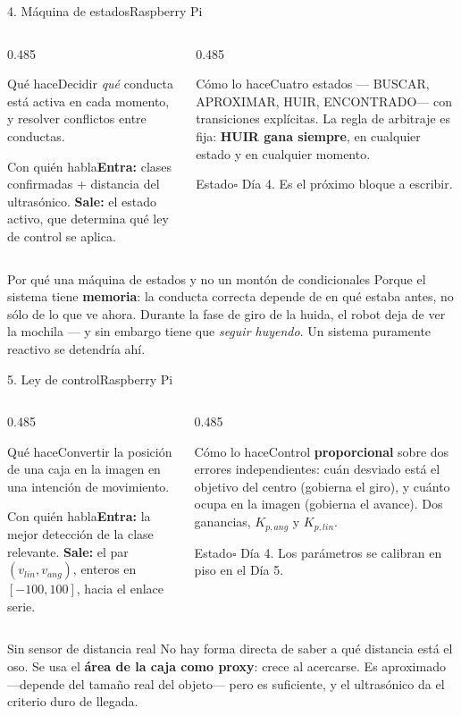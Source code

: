 \documentclass[aspectratio=169,10pt]{beamer}
\newcommand{\pend}{\textcolor{grisclaro}{$\square$}}
\newcommand{\ficha}[4]{%
  {\footnotesize
  \begin{columns}[T,onlytextwidth]
    \begin{column}{0.485\textwidth}
      \begin{block}{Qué hace}#1\end{block}
      \begin{block}{Con quién habla}#3\end{block}
    \end{column}
    \begin{column}{0.485\textwidth}
      \begin{block}{Cómo lo hace}#2\end{block}
      \begin{block}{Estado}#4\end{block}
    \end{column}
  \end{columns}}}
\begin{document}
\begin{frame}{4. Máquina de estados\hfill{\small\mdseries Raspberry Pi}}
  \ficha
  {Decidir \emph{qué} conducta está activa en cada momento, y resolver
   conflictos entre conductas.}
  {Cuatro estados --- BUSCAR, APROXIMAR, HUIR, ENCONTRADO--- con transiciones
   explícitas. La regla de arbitraje es fija: \textbf{HUIR gana siempre}, en
   cualquier estado y en cualquier momento.}
  {\textbf{Entra:} clases confirmadas + distancia del ultrasónico.
   \textbf{Sale:} el estado activo, que determina qué ley de control se aplica.}
  {\pend{} Día 4. Es el próximo bloque a escribir.}

  \vspace{0.4em}
  \small
  \begin{block}{Por qué una máquina de estados y no un montón de condicionales}
    Porque el sistema tiene \textbf{memoria}: la conducta correcta depende de en
    qué estaba antes, no sólo de lo que ve ahora. Durante la fase de giro de la
    huida, el robot deja de ver la mochila --- y sin embargo tiene que
    \emph{seguir huyendo}. Un sistema puramente reactivo se detendría ahí.
  \end{block}
\end{frame}

\begin{frame}{5. Ley de control\hfill{\small\mdseries Raspberry Pi}}
  \ficha
  {Convertir la posición de una caja en la imagen en una intención de
   movimiento.}
  {Control \textbf{proporcional} sobre dos errores independientes: cuán desviado
   está el objetivo del centro (gobierna el giro), y cuánto ocupa en la imagen
   (gobierna el avance). Dos ganancias, $K_{p,ang}$ y $K_{p,lin}$.}
  {\textbf{Entra:} la mejor detección de la clase relevante.
   \textbf{Sale:} el par $(v_{lin}, v_{ang})$, enteros en $[-100, 100]$, hacia
   el enlace serie.}
  {\pend{} Día 4. Los parámetros se calibran en piso en el Día 5.}

  \vspace{0.4em}
  \small
  \begin{alertblock}{Sin sensor de distancia real}
    No hay forma directa de saber a qué distancia está el oso. Se usa el
    \textbf{área de la caja como proxy}: crece al acercarse. Es aproximado
    ---depende del tamaño real del objeto--- pero es suficiente, y el ultrasónico
    da el criterio duro de llegada.
  \end{alertblock}
\end{frame}
\end{document}
